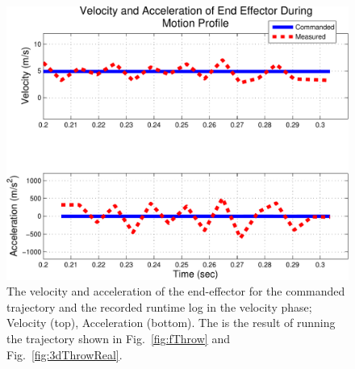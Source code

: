 \begin{figure}[thpb]
  \centering
\includegraphics[width=1.0\columnwidth]{./MATLAB/throwTrajRSPacc.pdf}
  \caption{The velocity and acceleration of the end-effector for the commanded trajectory and the recorded runtime log in the velocity phase; Velocity (top), Acceleration (bottom).  The is the result of running the trajectory shown in Fig.~\ref{fig:fThrow} and Fig.~\ref{fig:3dThrowReal}.}
  \label{fig:posPlot}
\end{figure}









